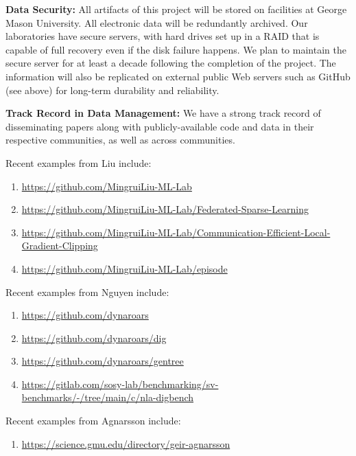 \documentclass[11pt]{article}
\begin{document}
\textbf{Data Security:} All artifacts of this project will be stored on facilities at George Mason University. All electronic data will be redundantly archived. Our laboratories have secure servers, with  hard drives set up in a RAID that is capable of full recovery even if the disk failure happens. We plan to maintain the secure server for at least a decade following the completion of the project. The information will also be replicated on external public Web servers such as GitHub (see above) for long-term durability and reliability. 

\textbf{Track Record in Data Management:} We have a strong track record of disseminating papers along with publicly-available code and data in their respective communities, as well as across communities. 

\alert{Recent examples from Liu include:}

\begin{enumerate}
    \item \url{https://github.com/MingruiLiu-ML-Lab}
    \item \url{https://github.com/MingruiLiu-ML-Lab/Federated-Sparse-Learning}
    \item \url{https://github.com/MingruiLiu-ML-Lab/Communication-Efficient-Local-Gradient-Clipping}
    \item \url{https://github.com/MingruiLiu-ML-Lab/episode}
\end{enumerate}


\alert{Recent examples from Nguyen include:}

\begin{enumerate}
    \item \url{https://github.com/dynaroars}
    \item \url{https://github.com/dynaroars/dig}
    \item \url{https://github.com/dynaroars/gentree}
    \item \url{https://gitlab.com/sosy-lab/benchmarking/sv-benchmarks/-/tree/main/c/nla-digbench}
\end{enumerate}

\alert{Recent examples from Agnarsson include:}

\begin{enumerate}
    \item \url{https://science.gmu.edu/directory/geir-agnarsson}
\end{enumerate}
\end{document}
